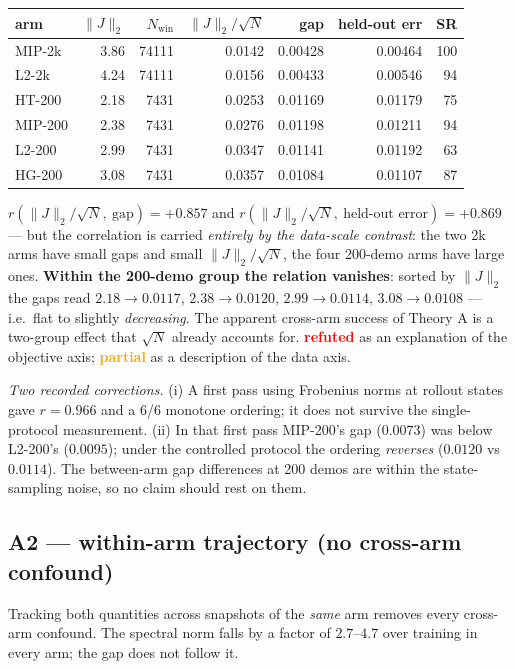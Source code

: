 \documentclass[10pt]{article}
\newcommand{\no}{\textcolor{red}{\textbf{refuted}}}
\newcommand{\partialv}{\textcolor{orange}{\textbf{partial}}}
\begin{document}
\begin{center}\small
\begin{tabular}{lrrrrrr}
\toprule
arm & $\|J\|_2$ & $N_{\text{win}}$ & $\|J\|_2/\sqrt{N}$ & gap & held-out err & SR \\
\midrule
MIP-2k  & 3.86 & 74111 & 0.0142 & 0.00428 & 0.00464 & 100 \\
L2-2k   & 4.24 & 74111 & 0.0156 & 0.00433 & 0.00546 & 94 \\
HT-200  & 2.18 & 7431  & 0.0253 & 0.01169 & 0.01179 & 75 \\
MIP-200 & 2.38 & 7431  & 0.0276 & 0.01198 & 0.01211 & 94 \\
L2-200  & 2.99 & 7431  & 0.0347 & 0.01141 & 0.01192 & 63 \\
HG-200  & 3.08 & 7431  & 0.0357 & 0.01084 & 0.01107 & 87 \\
\bottomrule
\end{tabular}
\end{center}

$r(\|J\|_2/\sqrt N,\ \text{gap}) = +0.857$ and
$r(\|J\|_2/\sqrt N,\ \text{held-out error}) = +0.869$ --- but the
correlation is carried \emph{entirely by the data-scale contrast}: the
two 2k arms have small gaps and small $\|J\|_2/\sqrt N$, the four
200-demo arms have large ones. \textbf{Within the 200-demo group the
relation vanishes}: sorted by $\|J\|_2$ the gaps read
$2.18\!\to\!0.0117$, $2.38\!\to\!0.0120$, $2.99\!\to\!0.0114$,
$3.08\!\to\!0.0108$ --- i.e.\ flat to slightly \emph{decreasing}. The
apparent cross-arm success of Theory A is a two-group effect that
$\sqrt N$ already accounts for. \no{} as an explanation of the
objective axis; \partialv{} as a description of the data axis.

\emph{Two recorded corrections.} (i) A first pass using Frobenius norms
at rollout states gave $r=0.966$ and a 6/6 monotone ordering; it does not
survive the single-protocol measurement. (ii) In that first pass MIP-200's
gap ($0.0073$) was below L2-200's ($0.0095$); under the controlled
protocol the ordering \emph{reverses} ($0.0120$ vs $0.0114$). The
between-arm gap differences at 200 demos are within the state-sampling
noise, so no claim should rest on them.

\subsection*{A2 --- within-arm trajectory (no cross-arm confound)}
Tracking both quantities across snapshots of the \emph{same} arm removes
every cross-arm confound. The spectral norm falls by a factor of
$2.7$--$4.7$ over training in every arm; the gap does not follow it.
\end{document}
